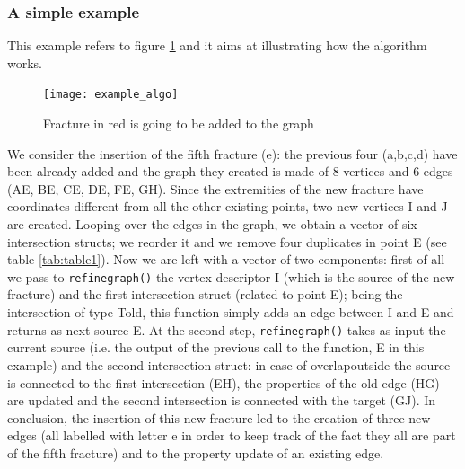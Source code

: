 \documentclass[10pt]{article} %
\begin{document}
	\subsubsection{A simple example}
	This example refers to figure \ref{fig:example_algo} and it aims at illustrating how the algorithm works.
	\begin{figure}
		\centering 
		\texttt{[image: example\_algo]}
		\caption{Fracture in red is going to be added to the graph}
		\label{fig:example_algo}
	\end{figure}
	We consider the insertion of the fifth fracture (e): the previous four (a,b,c,d) have been already added and the graph they created is made of 8 vertices and 6 edges (AE, BE, CE, DE, FE, GH).  
	Since the extremities of the new fracture have coordinates different from all the other existing points, two new vertices I and J are created. Looping over the edges in the graph, we obtain a vector of six intersection structs; we reorder it and we remove four duplicates in point E (see table \ref{tab:table1}).
	Now we are left with a vector of two components: first of all we pass to \texttt{refine\textunderscore graph()} the vertex descriptor I (which is the source of the new fracture) and the first intersection struct (related to point E); being the intersection of type T\textunderscore old, this function simply adds an edge between I and E and returns as next source E. At the second step, \texttt{refine\textunderscore graph()} takes as input the current source (i.e. the output of the previous call to the function, E in this example) and the second intersection struct: in case of overlap\textunderscore outside the source is connected to the first intersection (EH), the properties of the old edge (HG) are updated and the second intersection is connected with the target (GJ). In conclusion, the insertion of this new fracture led to the creation of three new edges (all labelled with letter e in order to keep track of the fact they all are part of the fifth fracture) and to the property update of an existing edge.
	
\end{document}
